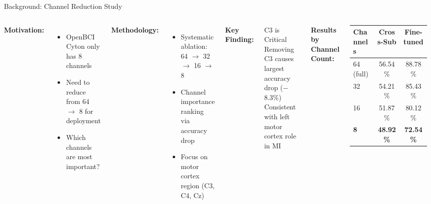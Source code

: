 \documentclass[aspectratio=169, 11pt]{beamer}
\begin{document}
\begin{frame}{Background: Channel Reduction Study}
    \begin{columns}[T]
        \textbf{Motivation:}
        \begin{itemize}
            \item OpenBCI Cyton only has 8 channels
            \item Need to reduce from 64 $\rightarrow$ 8 for deployment
            \item Which channels are most important?
        \end{itemize}
        
        \vspace{3mm}
        \textbf{Methodology:}
        \begin{itemize}
            \item Systematic ablation: 64 $\rightarrow$ 32 $\rightarrow$ 16 $\rightarrow$ 8
            \item Channel importance ranking via accuracy drop
            \item Focus on motor cortex region (C3, C4, Cz)
        \end{itemize}
        
        \vspace{3mm}
        \textbf{Key Finding:}
        \begin{alertblock}{C3 is Critical}
            Removing C3 causes largest accuracy drop ($-$8.3\%)\\
            Consistent with left motor cortex role in MI
        \end{alertblock}
        
        \textbf{Results by Channel Count:}
        
        \vspace{1mm}
        \begin{table}
            \centering
            \small
            \begin{tabular}{lcc}
                \toprule
                Channels & Cross-Sub & Fine-tuned \\
                \midrule
                64 (full) & 56.54\% & 88.78\% \\
                32 & 54.21\% & 85.43\% \\
                16 & 51.87\% & 80.12\% \\
                \textbf{8} & \textbf{48.92\%} & \textbf{72.54\%} \\
                \bottomrule
            \end{tabular}
        \end{table}
        

\end{columns}
\end{frame}
\end{document}
